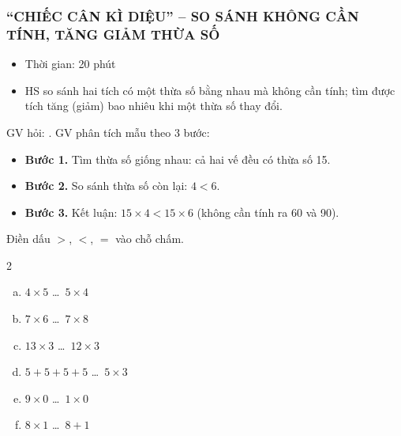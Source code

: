 \documentclass[../main.tex]{subfiles}
\begin{document}
\subsubsection{“CHIẾC CÂN KÌ DIỆU” -- SO SÁNH KHÔNG CẦN TÍNH, TĂNG GIẢM THỪA SỐ}
\begin{hd}
    \begin{itemize}
        \item Thời gian: 20 phút
        \item HS so sánh hai tích có một thừa số bằng nhau mà không cần tính; tìm được tích tăng (giảm) bao nhiêu khi một thừa số thay đổi.
    \end{itemize}
\end{hd}
GV hỏi:  . GV phân tích mẫu theo 3 bước:
\begin{itemize}
    \item \textbf{Bước 1.} Tìm thừa số giống nhau: cả hai vế đều có thừa số 15.
    \item \textbf{Bước 2.} So sánh thừa số còn lại: $4 < 6$.
    \item \textbf{Bước 3.} Kết luận: $15 \times 4 < 15 \times 6$ (không cần tính ra 60 và 90).
\end{itemize}
\begin{bt}
Điền dấu $>$, $<$, $=$ vào chỗ chấm.
\begin{multicols}{2}
\begin{enumerate}[a)]
    \item $4 \times 5$ \dots\ $5 \times 4$ \hfill {}
    \item $7 \times 6$ \dots\ $7 \times 8$ \hfill {}
    \item $13 \times 3$ \dots\ $12 \times 3$ \hfill {}
    \item $5+5+5+5$ \dots\ $5 \times 3$ \hfill {}
    \item $9 \times 0$ \dots\ $1 \times 0$ \hfill {}
    \item $8 \times 1$ \dots\ $8 + 1$ \hfill {}
\end{enumerate}
\end{multicols}
\end{bt}
\end{document}

